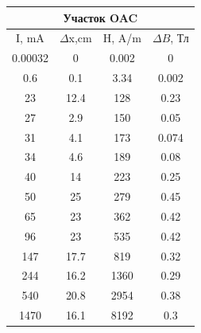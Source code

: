 \documentclass[a4paper,12pt]{article} %
\begin{document}
\begin{tabular}{|c|c|c|c|}
\hline 
\multicolumn{4}{|c|}{Участок OAC} \\ 
\hline
I, mA & $\Delta$x,cm & H, A/m & $\Delta B$, Тл \\

\hline 
0.00032 & 0&0.002       & 0  \\ 
\hline 
0.6 & 0.1 &   3.34    & 0.002 \\ 
\hline 
23 & 12.4 &    128   & 0.23 \\ 
\hline 
27 & 2.9 &  150     & 0.05 \\ 
\hline 
31 &  4.1&     173  & 0.074 \\ 
\hline 
34 & 4.6 &     189  & 0.08\\ 
\hline 
40 & 14&    223   & 0.25 \\ 
\hline 
50 & 25 &   279    & 0.45\\ 
\hline 
65 & 23&   362    &  0.42\\ 
\hline 
96 & 23&535       &  0.42\\ 
\hline 
147 & 17.7&819       & 0.32 \\ 
\hline 
244 & 16.2&   1360    & 0.29 \\ 
\hline 
540 & 20.8&    2954   & 0.38 \\ 
\hline 
1470 & 16.1&     8192  & 0.3 \\ 
\hline 

\end{tabular} 
\end{document}
